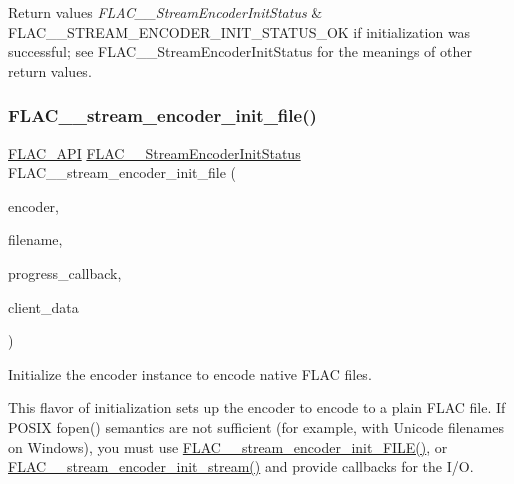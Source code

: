 \begin{DoxyRetVals}{Return values}
{\em F\+L\+A\+C\+\_\+\+\_\+\+Stream\+Encoder\+Init\+Status} & {\ttfamily F\+L\+A\+C\+\_\+\+\_\+\+S\+T\+R\+E\+A\+M\+\_\+\+E\+N\+C\+O\+D\+E\+R\+\_\+\+I\+N\+I\+T\+\_\+\+S\+T\+A\+T\+U\+S\+\_\+\+OK} if initialization was successful; see F\+L\+A\+C\+\_\+\+\_\+\+Stream\+Encoder\+Init\+Status for the meanings of other return values. \\
\hline
\end{DoxyRetVals}
\mbox{\label{group__flac__stream__encoder_ga693bb5ed30d912822e0e6c7c0404428c}} 
\subsubsection{\texorpdfstring{FLAC\_\_stream\_encoder\_init\_file()}{FLAC\_\_stream\_encoder\_init\_file()}}
{\footnotesize\ttfamily \mbox{\hyperlink{group__flac__export_ga56ca07df8a23310707732b1c0007d6f5}{F\+L\+A\+C\+\_\+\+A\+PI}} \mbox{\hyperlink{group__flac__stream__encoder_ga3bb869620af2b188d77982a5c30b047d}{F\+L\+A\+C\+\_\+\+\_\+\+Stream\+Encoder\+Init\+Status}} F\+L\+A\+C\+\_\+\+\_\+stream\+\_\+encoder\+\_\+init\+\_\+file (\begin{DoxyParamCaption}\item[{\mbox{\hyperlink{struct_f_l_a_c_____stream_encoder}{F\+L\+A\+C\+\_\+\+\_\+\+Stream\+Encoder}} $\ast$}]{encoder,  }\item[{const char $\ast$}]{filename,  }\item[{\mbox{\hyperlink{group__flac__stream__encoder_ga6e051c0e5837433f9e7cd56cd42ca6ba}{F\+L\+A\+C\+\_\+\+\_\+\+Stream\+Encoder\+Progress\+Callback}}}]{progress\+\_\+callback,  }\item[{\mbox{\hyperlink{_s_d_l__opengles2__gl2ext_8h_ae5d8fa23ad07c48bb609509eae494c95}{void}} $\ast$}]{client\+\_\+data }\end{DoxyParamCaption})}

Initialize the encoder instance to encode native F\+L\+AC files.

This flavor of initialization sets up the encoder to encode to a plain F\+L\+AC file. If P\+O\+S\+IX fopen() semantics are not sufficient (for example, with Unicode filenames on Windows), you must use \mbox{\hyperlink{group__flac__stream__encoder_ga78653fea5d9bc490fff34e3ef86de944}{F\+L\+A\+C\+\_\+\+\_\+stream\+\_\+encoder\+\_\+init\+\_\+\+F\+I\+L\+E()}}, or \mbox{\hyperlink{group__flac__stream__encoder_ga85221c4ceb9f22dfd4983d8f07a9a35b}{F\+L\+A\+C\+\_\+\+\_\+stream\+\_\+encoder\+\_\+init\+\_\+stream()}} and provide callbacks for the I/O.

